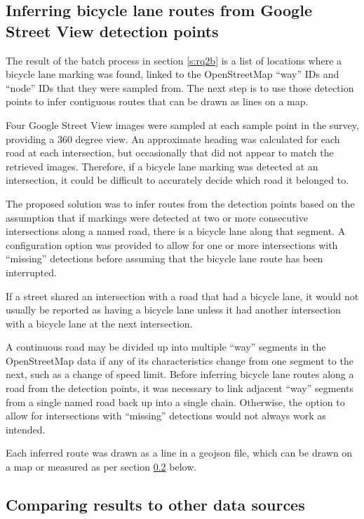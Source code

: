 \documentclass[11pt,twoside]{report}
\begin{document}
\subsection{Inferring bicycle lane routes from Google Street View detection points}
\label{s:rq2c}

The result of the batch process in section \ref{s:rq2b} is a list of locations where a bicycle lane marking was found, linked to the OpenStreetMap ``way'' IDs and ``node'' IDs that they were sampled from.  The next step is to use those detection points to infer contiguous routes that can be drawn as lines on a map.

Four Google Street View images were sampled at each sample point in the survey, providing a 360 degree view.  An approximate heading was calculated for each road at each intersection, but occasionally that did not appear to match the retrieved images.  Therefore, if a bicycle lane marking was detected at an intersection, it could be difficult to accurately decide which road it belonged to.

The proposed solution was to infer routes from the detection points based on the assumption that if markings were detected at two or more consecutive intersections along a named road, there is a bicycle lane along that segment.  A configuration option was provided to allow for one or more intersections with ``missing'' detections before assuming that the bicycle lane route has been interrupted.

If a street shared an intersection with a road that had a bicycle lane, it would not usually be reported as having a bicycle lane unless it had another intersection with a bicycle lane at the next intersection.

A continuous road may be divided up into multiple ``way'' segments in the OpenStreetMap data if any of its characteristics change from one segment to the next, such as a change of speed limit.  Before inferring bicycle lane routes along a road from the detection points, it was necessary to link adjacent ``way'' segments from a single named road back up into a single chain.  Otherwise, the option to allow for intersections with ``missing'' detections would not always work as intended.

Each inferred route was drawn as a line in a geojson file, which can be drawn on a map or measured as per section \ref{s:rq2d} below.


\subsection{Comparing results to other data sources}
\label{s:rq2d}
\end{document}

